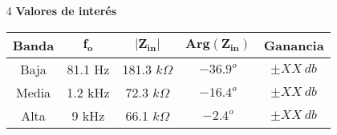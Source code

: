 \documentclass[a4paper]{article}
\begin{document}
\begin{multicols}{2}
\begin{enumerate}
	\item[4] \textbf{Valores de interés}
	\begin{table}[H]
		\begin{tabular}{ccccc}
			\hline			
			\textbf{Banda} & $\mathbf{f_o}$ & $\mathbf{|Z_{in}|}$ & $\mathbf{Arg\left(Z_{in}\right)}$ & \textbf{Ganancia} \\
			\hline
			Baja           & 81.1 Hz                     & 181.3 $k\Omega$     & $-36.9^o$                           & $\pm XX \ db$          \\
			Media          & 1.2 kHz                     & 72.3 $k\Omega$      & $-16.4^o$                           & $\pm XX \ db$          \\
			Alta           & 9 kHz                       & 66.1 $k\Omega$      & $-2.4^o$                            & $\pm XX \ db$         	\\
			\hline
		\end{tabular}
	\end{table}

\end{enumerate}
\end{multicols}

%	
%		
\end{document}
